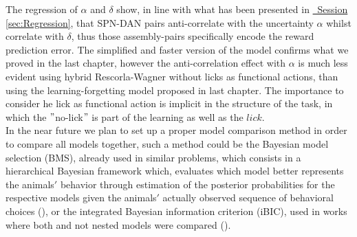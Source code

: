 The regression of $\alpha$ and $\delta$ show, in line with what has been presented in \hyperref[sec:Regression]{~Session \ref*{sec:Regression}}, that SPN-DAN pairs anti-correlate with the uncertainty $\alpha$ whilst correlate with $\delta$, thus those assembly-pairs specifically encode the reward prediction error. The simplified and faster version of the model confirms what we proved in the last chapter, however the anti-correlation effect with $\alpha$ is much less evident using hybrid Rescorla-Wagner without licks as functional actions, than using the learning-forgetting model proposed in last chapter. The importance to consider he lick as functional action is implicit in the structure of the task, in which the $"$no-lick$"$ is part of the learning as well as the $lick$.\\In the near future we plan to set up a proper model comparison method in order to compare all models together, such a method could be the Bayesian model selection (BMS), already used in similar problems, which consists in a hierarchical Bayesian framework which, evaluates which model better represents the animals$'$ behavior through estimation of the posterior probabilities for the respective models given the animals$'$ actually observed sequence of behavioral choices (\cite{Koppe}), or the integrated Bayesian information criterion (iBIC), used in works where both and not nested models were compared (\cite{Dayan}).